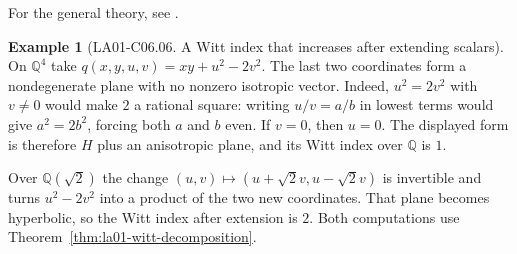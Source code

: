 \documentclass[11pt,oneside,openany]{book}
\theoremstyle{definition}
\newtheorem{example}[theorem]{Example}
\theoremstyle{remark}
\begin{document}
For the general theory, see \cite[Ch.~II, Secs.~7--8]{witt-source}.

\begin{example}[LA01-C06.06. A Witt index that increases after extending scalars]
\label{ex:la01-witt-base-change}
On \(\mathbb{Q}^4\) take \(q(x,y,u,v)=xy+u^2-2v^2\).
The last two coordinates form a nondegenerate plane with no
nonzero isotropic vector. Indeed, \(u^2=2v^2\) with \(v\ne 0\)
would make \(2\) a rational square: writing \(u/v=a/b\) in
lowest terms would give \(a^2=2b^2\), forcing both \(a\) and
\(b\) even. If \(v=0\), then \(u=0\). The displayed form is
therefore \(H\) plus an anisotropic plane, and its Witt index
over \(\mathbb{Q}\) is \(1\).

Over \(\mathbb{Q}(\sqrt{2})\) the change
\((u,v)\mapsto(u+\sqrt{2}v,u-\sqrt{2}v)\) is invertible and
turns \(u^2-2v^2\) into a product of the two new coordinates.
That plane becomes hyperbolic, so the Witt index after extension
is \(2\). Both computations use
Theorem~\ref{thm:la01-witt-decomposition}.
\end{example}
\end{document}
